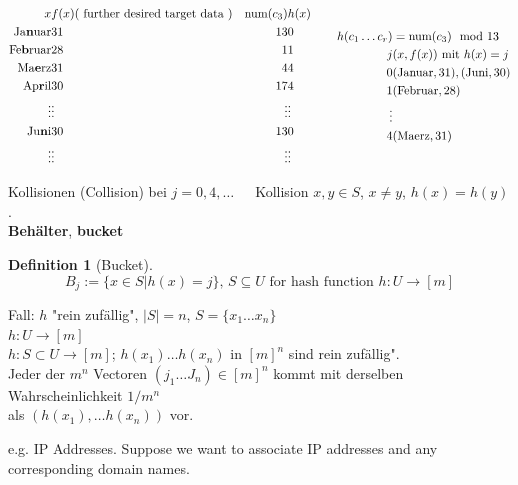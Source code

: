 \documentclass[10pt]{amsart}
\newtheorem{definition}{Definition}
\begin{document}
\begin{multicols*}{2}
\[
\begin{gathered}
\begin{aligned} 
x & f(x) (\text{ further desired target data }) & \text{num}(c_3) & h(x) \\
\text{Ja\textbf{n}uar} & 31 & 13 & 0 \\
\text{Fe\textbf{b}ruar} & 28 & 1 & 1 \\
\text{Ma\textbf{e}rz} & 31 & 4 & 4 \\
\text{Ap\textbf{r}il} & 30 & 17 & 4 \\
\vdots & \vdots & \vdots & \vdots \\ 
\text{Ju\textbf{n}i} & 30 & 13 & 0 \\
\vdots & \vdots & \vdots & \vdots 
\end{aligned} 
\quad \quad \, 
\begin{aligned}
h(c_1 \dots c_r) & = \text{num}(c_3) \mod{13} \\
j & (x,f(x)) \text{ mit } h(x) = j \\ 
0 & (\text{Januar}, 31), (\text{Juni}, 30) \\
1 & (\text{Februar}, 28) \\
\vdots & \\
4 & (\text{Maerz}, 31) 
\end{aligned}
\end{gathered}
\]

Kollisionen (Collision) bei $j= 0,4, \dots  \quad \,$ Kollision $x, y \in S$, $x\neq y$, $h(x) = h(y)$.  \\

\textbf{Beh\"{a}lter}, \textbf{bucket}
\begin{definition}[Bucket]
	\begin{equation}
	B_j := \lbrace x \in S | h(x) = j \rbrace, \, S\subseteq U \text{ for hash function } h : U\to [m] 
	\end{equation}
\end{definition}

Fall: $h$ "rein zuf\"{a}llig", $|S| = n$, $S= \lbrace x_1 \dots x_n \rbrace$ \\
$h : U \to [m]$ \\
$h: S \subset U \to [m]$; $h(x_1) \dots h(x_n)$ in $[m]^n$ sind rein zuf\"{a}llig".  \\

Jeder der $m^n$ Vectoren $(j_1 \dots J_n) \in [m]^n$ kommt mit derselben Wahrscheinlichkeit $1/m^n$ \\
als $(h(x_1), \dots h(x_n))$ vor.

e.g. IP Addresses. Suppose we want to associate IP addresses and any corresponding domain names.


\end{multicols*}
\end{document}
